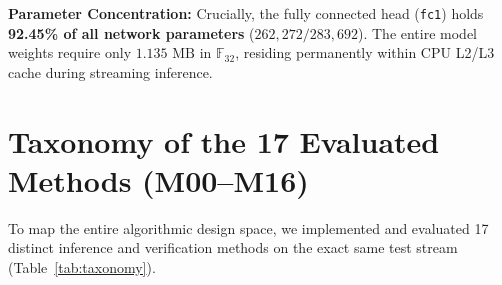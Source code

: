 \documentclass[journal,onecolumn,10pt]{IEEEtran}
\newcommand{\F}{\mathbb{F}}
\newcommand{\code}[1]{{\small\ttfamily\nolinkurl{#1}}}
\theoremstyle{remark}
\begin{document}
\textbf{Parameter Concentration:} Crucially, the fully connected head (\code{fc1}) holds \textbf{92.45\% of all network parameters} ($262,272 / 283,692$). The entire model weights require only $1.135\text{ MB}$ in $\F_{32}$, residing permanently within CPU L2/L3 cache during streaming inference.

\section{Taxonomy of the 17 Evaluated Methods (M00--M16)}
To map the entire algorithmic design space, we implemented and evaluated 17 distinct inference and verification methods on the exact same test stream (Table~\ref{tab:taxonomy}).
\end{document}

